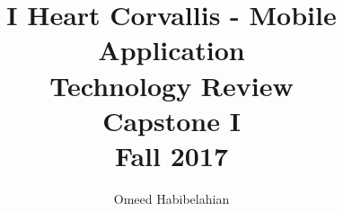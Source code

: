 \documentclass[draftclsnofoot, onecolumn, 10pt, compsoc]{IEEEtran}
\title{\textbf{I Heart Corvallis - Mobile Application\\Technology Review}\\Capstone I\\Fall 2017}
\author{Omeed Habibelahian}
\begin{document}
	\maketitle
	\begin{abstract}
	\end{abstract}
	\newpage
	
\end{document}
